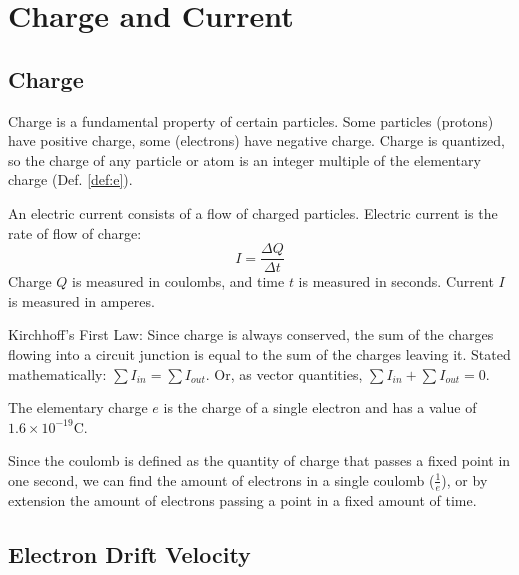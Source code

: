  

\section{Charge and Current}

\subsection{Charge}

Charge is a fundamental property of certain particles. Some particles (protons) have positive charge, some (electrons) have negative charge. Charge is quantized, so the charge of any particle or atom is an integer multiple of the elementary charge (Def. \ref{def:e}).

An electric current consists of a flow of charged particles. Electric current is the rate of flow of charge:
\begin{equation}
	I=\frac{\Delta Q}{\Delta t}
	\label{eq:chargedef}
\end{equation}
Charge $Q$ is measured in coulombs, and time $t$ is measured in seconds. Current $I$ is measured in amperes.

\begin{definition}
	Kirchhoff's First Law: Since charge is always conserved, the sum of the charges flowing into a circuit junction is equal to the sum of the charges leaving it. Stated mathematically: $\sum{I_{in}} = \sum{I_{out}}$. Or, as vector quantities, $\sum{I_{in}} + \sum{I_{out}} = 0$.
\end{definition}

\begin{definition}
	The elementary charge $e$ is the charge of a single electron and has a value of $1.6\times10^{-19}\si{\coulomb}$.
	\label{def:e}
\end{definition}

Since the coulomb is defined as the quantity of charge that passes a fixed point in one second, we can find the amount of electrons in a single coulomb ($\frac{1}{e}$), or by extension the amount of electrons passing a point in a fixed amount of time. 

\subsection{Electron Drift Velocity}

